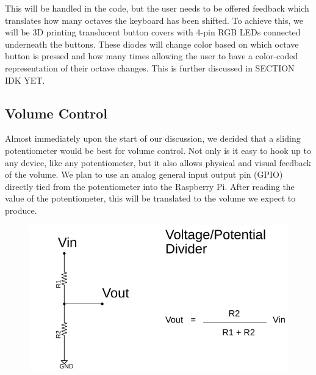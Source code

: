 \begin{table}[]
  \centering
  \caption{}
  \label{Tab:note_frequency}
\end{table}

This will be handled in the code, but the user needs to be offered feedback which translates how many octaves the keyboard has been shifted. To achieve this, we will be 3D printing translucent button covers with 4-pin RGB LEDs connected underneath the buttons. These diodes will change color based on which octave button is pressed and how many times allowing the user to have a color-coded representation of their octave changes. This is further discussed in SECTION IDK YET.

\subsection{Volume Control}

Almost immediately upon the start of our discussion, we decided that a sliding potentiometer would be best for volume control. Not only is it easy to hook up to any device, like any potentiometer, but it also allows physical and visual feedback of the volume. We plan to use an analog general input output pin (GPIO) directly tied from the potentiometer into the Raspberry Pi. After reading the value of the potentiometer, this will be translated to the volume we expect to produce.

\begin{figure}[h!]
  \centering
  \includegraphics[width=\linewidth]{image/VoltageDiv.png}
  \caption{}
  \label{fig:voltage_div}
\end{figure}

